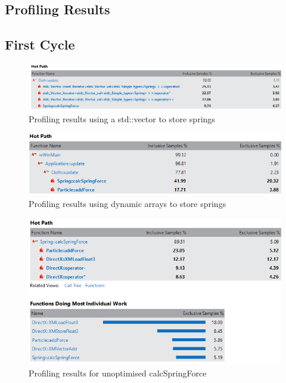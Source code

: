 \begin{landscape}
\chapter{Profiling Results}

\section{First Cycle}
  \begin{figure}[!htb]
    \begin{center}
      \includegraphics[scale=1.0]{Figures/vector_profiling_before}
    \end{center}
    \caption{Profiling results using a std::vector to store springs}
    \label{fig:profiling1}
  \end{figure}
  
    \begin{figure}
    \begin{center}
      \includegraphics[scale=1.0]{Figures/vector_profiling_after}
    \end{center}
    \caption{Profiling results using dynamic arrays to store springs}
    \label{fig:profiling2}
  \end{figure}
  
    \begin{figure}[!htb]
    \begin{center}
      \includegraphics[scale=1.0]{Figures/calcspringforce_profiling_before}
    \end{center}
    \caption{Profiling results for unoptimised calcSpringForce}
    \label{fig:profiling3}
  \end{figure}
  

\end{landscape}
